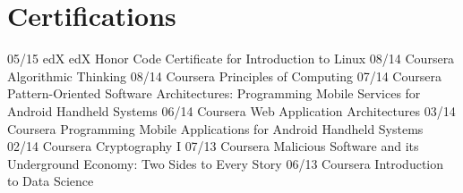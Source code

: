 \documentclass[]{friggeri-cv}
\begin{document}

\section{Certifications}
\begin{entrylist}
  \entry{}
    {05/15}
    {edX}
    {edX Honor Code Certificate for Introduction to Linux}
  \entry{}
    {08/14}
    {Coursera}
    {Algorithmic Thinking}
  \entry{}
    {08/14}
    {Coursera}
    {Principles of Computing}
  \entry{}
    {07/14}
    {Coursera}
    {Pattern-Oriented Software Architectures: Programming Mobile Services for Android Handheld Systems}
  \entry{}
    {06/14}
    {Coursera}
    {Web Application Architectures}
  \entry{}
    {03/14}
    {Coursera}
    {Programming Mobile Applications for Android Handheld Systems}
  \entry{}
    {02/14}
    {Coursera}
    {Cryptography I}
  \entry{}
    {07/13}
    {Coursera}
    {Malicious Software and its Underground Economy: Two Sides to Every Story}
  \entry{}
    {06/13}
    {Coursera}
    {Introduction to Data Science}
\end{entrylist}
\end{document}
